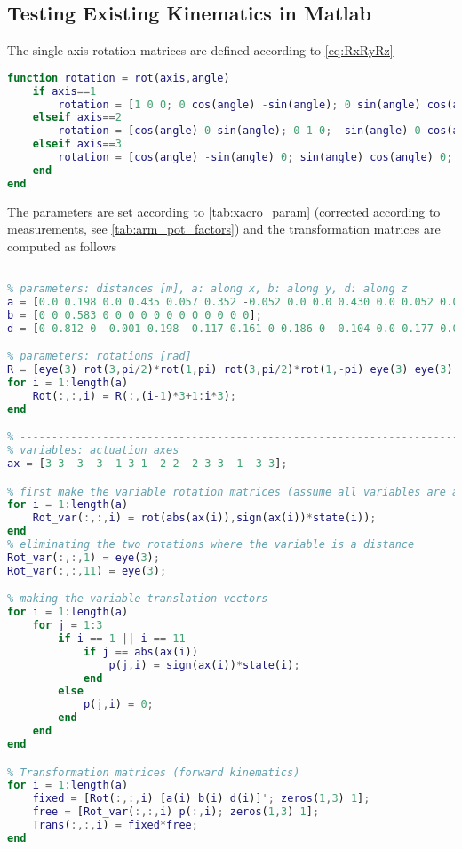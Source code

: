 \newpage

\subsection{Testing Existing Kinematics in Matlab}
The single-axis rotation matrices are defined according to \autoref{eq:RxRyRz}

\begin{lstlisting}[language=matlab]
function rotation = rot(axis,angle)
	if axis==1
		rotation = [1 0 0; 0 cos(angle) -sin(angle); 0 sin(angle) cos(angle)];
	elseif axis==2
		rotation = [cos(angle) 0 sin(angle); 0 1 0; -sin(angle) 0 cos(angle)];
	elseif axis==3
		rotation = [cos(angle) -sin(angle) 0; sin(angle) cos(angle) 0; 0 0 1];
	end
end
\end{lstlisting}

The parameters are set according to \autoref{tab:xacro_param} (corrected according to measurements, see \autoref{tab:arm_pot_factors}) and the transformation matrices are computed as follows

\begin{lstlisting}[language=matlab]
%% Existing reference frames according to xacro files

% parameters: distances [m], a: along x, b: along y, d: along z
a = [0.0 0.198 0.0 0.435 0.057 0.352 -0.052 0.0 0.0 0.430 0.0 0.052 0.0 0.0 0.0];
b = [0 0 0.583 0 0 0 0 0 0 0 0 0 0 0 0];
d = [0 0.812 0 -0.001 0.198 -0.117 0.161 0 0.186 0 -0.104 0.0 0.177 0.009 0.009];

% parameters: rotations [rad]
R = [eye(3) rot(3,pi/2)*rot(1,pi) rot(3,pi/2)*rot(1,-pi) eye(3) eye(3) eye(3) eye(3) rot(2,-0.1745) rot(2,0.1745)*rot(1,pi) rot(1,pi) eye(3) rot(3,pi/2)*rot(1,pi) eye(3) rot(2,pi/2)*rot(1,pi/2) rot(2,pi/2)*rot(1,pi/2)];
for i = 1:length(a)
	Rot(:,:,i) = R(:,(i-1)*3+1:i*3);
end

% -------------------------------------------------------------------------
% variables: actuation axes
ax = [3 3 -3 -3 -1 3 1 -2 2 -2 3 3 -1 -3 3];

% first make the variable rotation matrices (assume all variables are angles)
for i = 1:length(a)
	Rot_var(:,:,i) = rot(abs(ax(i)),sign(ax(i))*state(i));
end
% eliminating the two rotations where the variable is a distance
Rot_var(:,:,1) = eye(3);
Rot_var(:,:,11) = eye(3);

% making the variable translation vectors
for i = 1:length(a)
	for j = 1:3
		if i == 1 || i == 11
			if j == abs(ax(i)) 
				p(j,i) = sign(ax(i))*state(i);
			end
		else
			p(j,i) = 0;
		end
	end
end

% Transformation matrices (forward kinematics)
for i = 1:length(a)
	fixed = [Rot(:,:,i) [a(i) b(i) d(i)]'; zeros(1,3) 1];
	free = [Rot_var(:,:,i) p(:,i); zeros(1,3) 1];
	Trans(:,:,i) = fixed*free;
end
\end{lstlisting}

